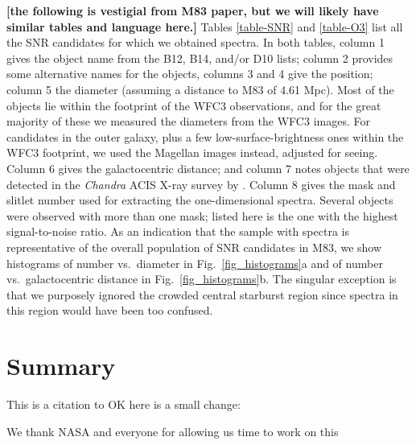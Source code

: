 {\bf [the following is vestigial from M83 paper, but we will likely have similar tables and language here.]} Tables \ref{table-SNR} and \ref{table-O3} list all the SNR candidates for which we obtained spectra.  In both tables, column 1 gives the object name from  the B12, B14, and/or D10 lists; column 2 provides some alternative names for the objects, columns 3 and 4 give the position; column 5 the diameter (assuming a distance to M83 of 4.61 Mpc).  Most of the objects lie within the footprint of the WFC3 observations, and for the great majority of these we measured the diameters from the WFC3 images.  For candidates in the outer galaxy, plus a few low-surface-brightness ones within the WFC3 footprint, we used the Magellan images instead, adjusted for seeing.   Column 6 gives the galactocentric distance; and column 7 notes objects that were detected in the {\em Chandra} ACIS X-ray survey by \citet{long14}.  Column 8 gives the mask and slitlet number used for extracting the one-dimensional spectra.  Several objects were observed with more than one mask; listed here is the one with the highest signal-to-noise ratio.   As an indication that the sample with spectra is representative of the overall population of SNR candidates in M83, we show  histograms of number vs.\ diameter in Fig.~\ref{fig_histograms}a and of number vs.\ galactocentric distance in Fig.~\ref{fig_histograms}b. The singular exception is that we purposely ignored the crowded central starburst region since spectra in this region would have been too confused.


\section{Summary \label{sec:summary}}

This is a citation to \cite{long14}   OK here is a small change:

\acknowledgments

We thank NASA and everyone for allowing us time to work on this

\pagebreak





\clearpage










%

